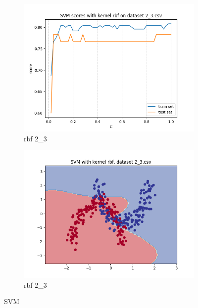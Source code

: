 \documentclass[12pt]{article}
\newcommand*{\subfigwidth}{0.24\textwidth}
\begin{document}
\begin{figure}[H]
\begin{subfigure}[t]{\subfigwidth}
        \includegraphics[width=\linewidth]{img/exp_1/svm/2_3/rbf/scores.png}
        \caption{rbf 2\_3}
    \end{subfigure}
    \hfill
    \begin{subfigure}[t]{\subfigwidth}
        \includegraphics[width=\linewidth]{img/exp_1/svm/2_3/rbf/boundary.png}
        \caption{rbf 2\_3}
    \end{subfigure}
    \caption{SVM}
\end{figure}

\clearpage
\end{document}
